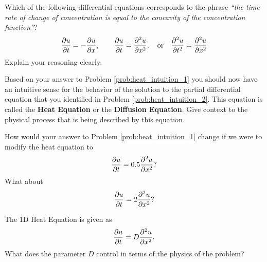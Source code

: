\begin{problem}
\begin{center}
    \end{center}
\end{problem}


\begin{problem}\label{prob:heat_intuition_2}
    Which of the following differential equations corresponds to the phrase 
        {\it ``the time rate of change of concentration is equal to the concavity of the
        concentration function''}?
        \[ \frac{\partial{u}}{\partial{t}} = -\frac{\partial{u}}{\partial{x}}, \qquad \frac{\partial{u}}{\partial{t}} = \frac{\partial^2{u}}{\partial{x}^2}, \quad \text{or} \quad \frac{\partial^2{u}}{\partial{t}^2} =
        \frac{\partial^2{u}}{\partial{x}^2} \]
        Explain your reasoning clearly.
\end{problem}

\begin{problem}
    Based on your answer to Problem \ref{prob:heat_intuition_1} you should now have an intuitive
    sense for the behavior of the solution to the partial differential equation that you
    identified in Problem \ref{prob:heat_intuition_2}.  This equation is called the {\bf Heat
    Equation} or the {\bf Diffusion Equation}.  Give context to the physical process that is being
    described by this equation.
\end{problem}

\begin{problem}
    How would your answer to Problem \ref{prob:heat_intuition_1} change if we were to
    modify the heat equation to 
    \[ \frac{\partial{u}}{\partial{t}} = 0.5 \frac{\partial^2{u}}{\partial{x}^2}? \]
    What about 
    \[ \frac{\partial{u}}{\partial{t}} = 2 \frac{\partial^2{u}}{\partial{x}^2}? \]
\end{problem}

\begin{problem}
    The 1D Heat Equation is given as 
    \[ \frac{\partial{u}}{\partial{t}} = D \frac{\partial^2{u}}{\partial{x}^2}. \]
    What does the parameter $D$ control in terms of the physics of the problem?
\end{problem}



